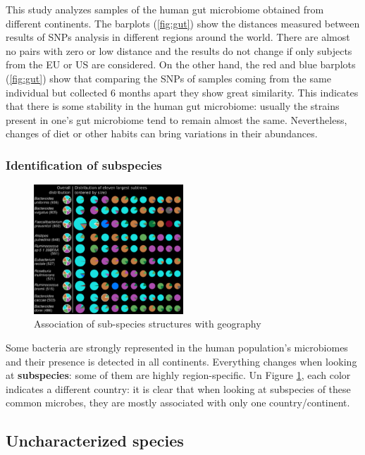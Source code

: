 This study analyzes samples of the human gut microbiome obtained from different continents. The barplots (\ref{fig:gut}) show the distances measured between results of SNPs analysis in different regions around the world. There are almost no pairs with zero or low distance and the results do not change if only subjects from the EU or US are considered.
On the other hand, the red and blue barplots (\ref{fig:gut}) show that comparing the SNPs of samples coming from the same individual but collected 6 months apart they show great similarity. This indicates that there is some stability in the human gut microbiome: usually the strains present in one’s gut microbiome tend to remain almost the same. Nevertheless, changes of diet or other habits can bring variations in their abundances.

\subsubsection{Identification of subspecies}

\begin{figure}[!h]
\centering
\includegraphics[width=0.5\textwidth]{strainGeo.png}
\caption{\label{fig:geo}Association of sub-species structures with geography}
\end{figure}

Some bacteria are strongly represented in the human population’s microbiomes and their presence is detected in all continents. Everything changes when looking at \textbf{subspecies}: some of them are highly region-specific. 
Un Figure \ref{fig:geo}, each color indicates a different country: it is clear that when looking at subspecies of these common microbes, they are mostly associated with only one country/continent.

\subsection{Uncharacterized species}

